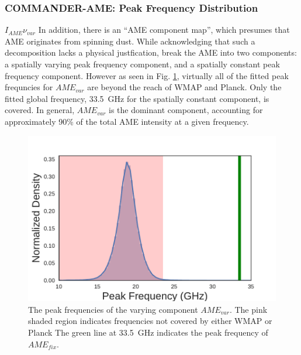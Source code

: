        \subsubsection{COMMANDER-AME: Peak Frequency Distribution}
        $I_{AME}\nu_{var}$
        In addition, there is an ``AME component map'', which presumes that AME originates from spinning dust. While acknowledging that such a decomposition lacks a physical justfication, \cite{planck15X} break the AME into two components: a spatially varying peak frequency component, and a spatially constant peak frequency component. However as seen in Fig. \ref{fig:AME_commander_freqdist}, virtually all of the fitted peak frequncies for $AME_{var}$ are beyond the reach of WMAP and Planck. Only the fitted global frequency, 33.5~GHz for the spatially constant component, is covered. In general, $AME_{var}$ is the dominant component, accounting for approximately 90\% of the total AME intensity at a given frequency.
        \begin{figure}
          \includegraphics[width=\textwidth]{../Plots/ch_intro/AME_commander_freqdist.pdf}
          \centering
          \caption{The peak frequencies of the varying component $AME_{var}$.  The pink shaded region indicates frequencies not covered by either WMAP or Planck The green line at 33.5~GHz indicates the peak frequency of $AME_{fix}$.}
          \label{fig:AME_commander_freqdist}
        \end{figure}

